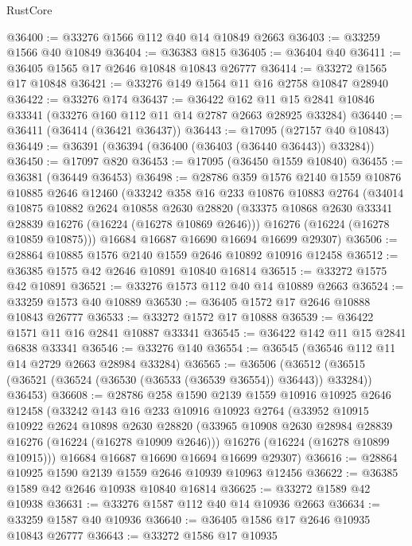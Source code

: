 \begin{lexlean}{RustCore}
\begin{coremodule}
@36400 := @33276 @1566 @112 @40 @14 @10849 @2663
@36403 := @33259 @1566 @40 @10849
@36404 := @36383 @815
@36405 := @36404 @40
@36411 := @36405 @1565 @17 @2646 @10848 @10843 @26777
@36414 := @33272 @1565 @17 @10848
@36421 := @33276 @149 @1564 @11 @16 @2758 @10847 @28940
@36422 := @33276 @174
@36437 := @36422
    @162
    @11
    @15
    @2841
    @10846
    @33341
    (@33276 @160 @112 @11 @14 @2787 @2663 @28925 @33284)
@36440 := @36411 (@36414 (@36421 @36437))
@36443 := @17095 (@27157 @40 @10843)
@36449 := @36391 (@36394 (@36400 (@36403 (@36440 @36443)) @33284))
@36450 := @17097 @820
@36453 := @17095 (@36450 @1559 @10840)
@36455 := @36381 (@36449 @36453)
@36498 := @28786
    @359
    @1576
    @2140
    @1559
    @10876
    @10885
    @2646
    @12460
    (@33242
      @358
      @16
      @233
      @10876
      @10883
      @2764
      (@34014
        @10875
        @10882
        @2624
        @10858
        @2630
        @28820
        (@33375 @10868 @2630 @33341 @28839 @16276 (@16224 (@16278 @10869 @2646)))
        @16276
        (@16224 (@16278 @10859 @10875)))
      @16684
      @16687
      @16690
      @16694
      @16699
      @29307)
@36506 := @28864 @10885 @1576 @2140 @1559 @2646 @10892 @10916 @12458
@36512 := @36385 @1575 @42 @2646 @10891 @10840 @16814
@36515 := @33272 @1575 @42 @10891
@36521 := @33276 @1573 @112 @40 @14 @10889 @2663
@36524 := @33259 @1573 @40 @10889
@36530 := @36405 @1572 @17 @2646 @10888 @10843 @26777
@36533 := @33272 @1572 @17 @10888
@36539 := @36422 @1571 @11 @16 @2841 @10887 @33341
@36545 := @36422 @142 @11 @15 @2841 @6838 @33341
@36546 := @33276 @140
@36554 := @36545 (@36546 @112 @11 @14 @2729 @2663 @28984 @33284)
@36565 := @36506
    (@36512 (@36515 (@36521 (@36524 (@36530 (@36533 (@36539 @36554)) @36443)) @33284)) @36453)
@36608 := @28786
    @258
    @1590
    @2139
    @1559
    @10916
    @10925
    @2646
    @12458
    (@33242
      @143
      @16
      @233
      @10916
      @10923
      @2764
      (@33952
        @10915
        @10922
        @2624
        @10898
        @2630
        @28820
        (@33965 @10908 @2630 @28984 @28839 @16276 (@16224 (@16278 @10909 @2646)))
        @16276
        (@16224 (@16278 @10899 @10915)))
      @16684
      @16687
      @16690
      @16694
      @16699
      @29307)
@36616 := @28864 @10925 @1590 @2139 @1559 @2646 @10939 @10963 @12456
@36622 := @36385 @1589 @42 @2646 @10938 @10840 @16814
@36625 := @33272 @1589 @42 @10938
@36631 := @33276 @1587 @112 @40 @14 @10936 @2663
@36634 := @33259 @1587 @40 @10936
@36640 := @36405 @1586 @17 @2646 @10935 @10843 @26777
@36643 := @33272 @1586 @17 @10935

\end{coremodule}
\end{lexlean}
